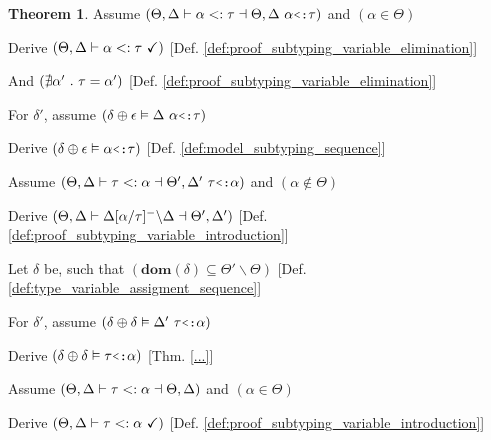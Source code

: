 \documentclass[acmsmall]{acmart}
\theoremstyle{definition}
\newtheorem{theorem}{Theorem}[section]
\begin{document}
\begin{theorem}

  \item \N Assume $(
    \Theta, \Delta \entails 
    \alpha \subtypes \tau
    \given \Theta, \Delta\ \alpha \J{<:} \tau
  )$ and $(
    \alpha \in \Theta 
  )$
  \item \I \N Derive $(
    \Theta, \Delta \vdash \alpha <: \tau \ \checkmark
  )$ [Def. \ref{def:proof_subtyping_variable_elimination}]
  \item \I \N And $(
    \nexists \alpha'  \ .\  \tau = \alpha'
  )$ [Def. \ref{def:proof_subtyping_variable_elimination}]

  \item \I \N For $\delta'$, assume $(
    \delta \oplus \epsilon \satisfies \Delta\ \alpha \J{<:} \tau 
  )$ 
  \item \I\I \N Derive $(
    \delta \oplus \epsilon \satisfies \alpha \J{<:} \tau
  )$ [Def. \ref{def:model_subtyping_sequence}]


  \item \N Assume $(
    \Theta, \Delta \entails 
    \tau \subtypes \alpha \given \Theta', \Delta'\ \tau\J{<:}\alpha
  )$ and $(
    \alpha \notin \Theta
  )$
  \item \I \N Derive $(
    \Theta, \Delta \vdash 
    \Delta[\alpha\slash\tau]^{-} \backslash \Delta \dashv \Theta', \Delta'
  )$ [Def. \ref{def:proof_subtyping_variable_introduction}]

  \item \I \N Let $\delta$ be, such that $(
    \textbf{dom}(\delta) \subseteq \Theta' \backslash \Theta
  )$ [Def. \ref{def:type_variable_assigment_sequence}]

  \item \I \N For $\delta'$, assume $(
    \delta \oplus \delta \satisfies \Delta'\ \tau \J{<:} \alpha
  )$ 
  \item \I\I \N Derive $(
    \delta \oplus \delta \satisfies \tau \J{<:} \alpha
  )$ [Thm. \ref{...}]


  \item \N Assume $(
    \Theta, \Delta \vdash 
    \tau <: \alpha \dashv \Theta, \Delta
  )$ and $(
    \alpha \in \Theta
  )$

  \item \I \N Derive $(
    \Theta, \Delta \vdash \tau <: \alpha \ \checkmark
  )$ [Def. \ref{def:proof_subtyping_variable_introduction}]


\end{theorem}
\end{document}
